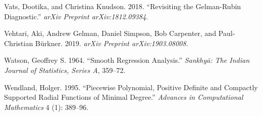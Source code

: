 \documentclass[
]{article}
\begin{document}
\leavevmode\hypertarget{ref-Vats:2018}{}%
Vats, Dootika, and Christina Knudson. 2018. ``Revisiting the
Gelman-Rubin Diagnostic.'' \emph{arXiv Preprint arXiv:1812.09384}.

\leavevmode\hypertarget{ref-Vehtari:2019}{}%
Vehtari, Aki, Andrew Gelman, Daniel Simpson, Bob Carpenter, and
Paul-Christian Bürkner. 2019. \emph{arXiv Preprint arXiv:1903.08008}.

\leavevmode\hypertarget{ref-Watson:1964}{}%
Watson, Geoffrey S. 1964. ``Smooth Regression Analysis.'' \emph{Sankhyā:
The Indian Journal of Statistics, Series A}, 359--72.

\leavevmode\hypertarget{ref-Wendland:1995}{}%
Wendland, Holger. 1995. ``Piecewise Polynomial, Positive Definite and
Compactly Supported Radial Functions of Minimal Degree.'' \emph{Advances
in Computational Mathematics} 4 (1): 389--96.
\end{document}
